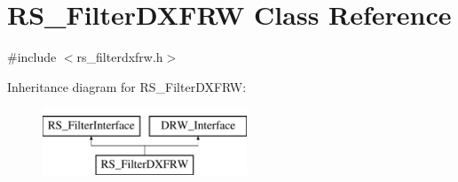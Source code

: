 \hypertarget{classRS__FilterDXFRW}{\section{R\-S\-\_\-\-Filter\-D\-X\-F\-R\-W Class Reference}
\label{classRS__FilterDXFRW}
}


{\ttfamily \#include $<$rs\-\_\-filterdxfrw.\-h$>$}

Inheritance diagram for R\-S\-\_\-\-Filter\-D\-X\-F\-R\-W\-:\begin{figure}[H]
\begin{center}
\leavevmode
\includegraphics[height=2.000000cm]{classRS__FilterDXFRW}
\end{center}
\end{figure}
